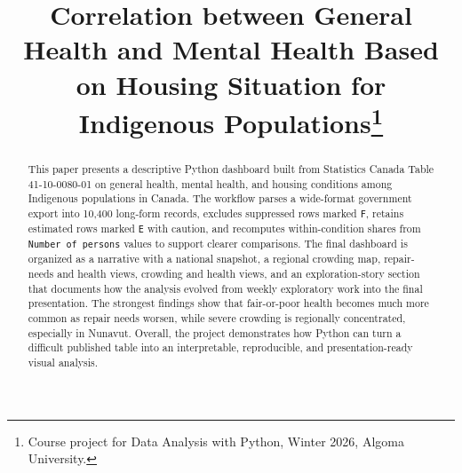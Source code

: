 \documentclass[conference]{IEEEtran}
\begin{document}
\title{Correlation between General Health and Mental Health Based on Housing Situation for Indigenous Populations\thanks{Course project for Data Analysis with Python, Winter 2026, Algoma University.}}

\author{
\and
{}
\and
{}
\and
{}
}

\maketitle

\begin{abstract}
This paper presents a descriptive Python dashboard built from Statistics Canada Table 41-10-0080-01 on general health, mental health, and housing conditions among Indigenous populations in Canada. The workflow parses a wide-format government export into 10,400 long-form records, excludes suppressed rows marked \texttt{F}, retains estimated rows marked \texttt{E} with caution, and recomputes within-condition shares from \texttt{Number of persons} values to support clearer comparisons. The final dashboard is organized as a narrative with a national snapshot, a regional crowding map, repair-needs and health views, crowding and health views, and an exploration-story section that documents how the analysis evolved from weekly exploratory work into the final presentation. The strongest findings show that fair-or-poor health becomes much more common as repair needs worsen, while severe crowding is regionally concentrated, especially in Nunavut. Overall, the project demonstrates how Python can turn a difficult published table into an interpretable, reproducible, and presentation-ready visual analysis.
\end{abstract}
\end{document}
